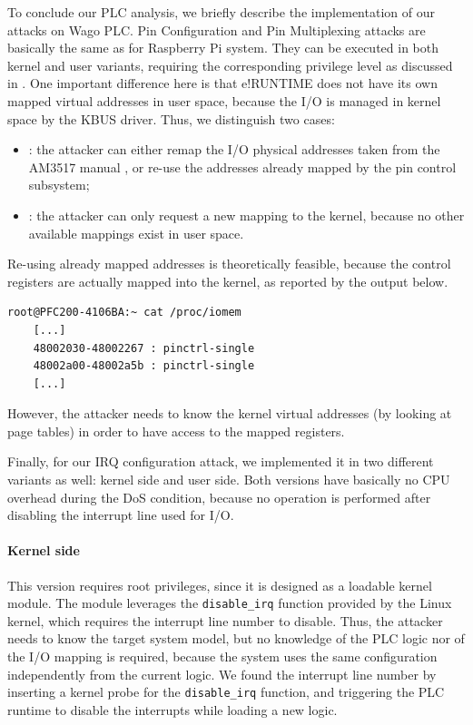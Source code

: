 To conclude our PLC analysis, we briefly describe the implementation of our attacks on Wago PLC.
Pin Configuration and Pin Multiplexing attacks are basically the same as for Raspberry Pi system. They can be executed in both kernel and user variants,
requiring the corresponding privilege level as discussed in .
One important difference here is that e!RUNTIME does not have its own mapped virtual addresses in user space, because the I/O is managed in kernel space
by the KBUS driver. Thus, we distinguish two cases:
\begin{itemize}
	\item {}: the attacker can either remap the I/O physical addresses taken from the AM3517 manual \cite{am35x},
	or re-use the addresses already mapped by the pin control subsystem;
	\item {}: the attacker can only request a new mapping to the kernel, because no other available mappings exist in user space.
\end{itemize}
Re-using already mapped addresses is theoretically feasible, because the control registers are actually mapped into the kernel, as reported by the output below.
\begin{Verbatim}[fontsize=\small]
	root@PFC200-4106BA:~ cat /proc/iomem 
	[...]
	48002030-48002267 : pinctrl-single
	48002a00-48002a5b : pinctrl-single
	[...]
\end{Verbatim}
However, the attacker needs to know the kernel virtual addresses (\eg by looking at page tables) in order to have access to the mapped registers.

Finally, for our IRQ configuration attack, we implemented it in two different variants as well: kernel side and user side.
Both versions have basically no CPU overhead during the DoS condition, because no operation is performed after disabling the interrupt line used for I/O.


\paragraph{Kernel side}

This version requires root privileges, since it is designed as a loadable kernel module.
The module leverages the \verb|disable_irq| function provided by the Linux kernel, which requires the interrupt line number to disable.
Thus, the attacker needs to know the target system model, but no knowledge of the PLC logic nor of the I/O mapping is required, because the system uses the same
configuration independently from the current logic.
We found the interrupt line number by inserting a kernel probe for the \verb|disable_irq| function, and triggering the PLC runtime to disable the interrupts
while loading a new logic.


